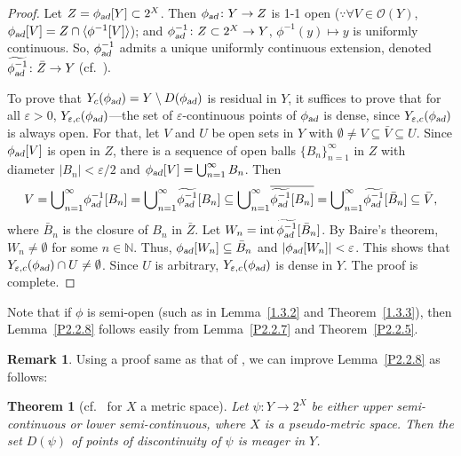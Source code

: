 \documentclass[12pt,final,3p,times]{elsarticle}
\newtheorem*{xthm}{Theorem}
\theoremstyle{definition}
\newtheorem{srem}[sthm]{Remark}
\numberwithin{equation}{section}
\begin{document}
\begin{proof}
Let $Z=\phi_{\textsl{ad}}[Y]\subset2^X$. Then $\phi_\textsl{ad}\colon Y\rightarrow Z$ is 1-1 open ($\because\forall V\in\mathscr{O}(Y)$, $\phi_{\textsl{ad}}[V]=Z\cap\langle \phi^{-1}[V]\rangle$); and $\phi_{\textsl{ad}}^{-1}\colon Z\subset2^X\rightarrow Y$, $\phi^{-1}(y)\mapsto y$ is uniformly continuous. So, $\phi_{\textsl{ad}}^{-1}$ admits a unique uniformly continuous extension, denoted $\widetilde{\phi_\textsl{ad}^{-1}}\colon \bar{Z}\rightarrow Y$\,(cf.~\cite[Thm.~6.26]{K55}).

To prove that $Y_c(\phi_\textsl{ad})=Y\setminus D(\phi_\textsl{ad})$ is residual in $Y$, it suffices to prove that for all $\varepsilon>0$, $Y_{\varepsilon,c}(\phi_\textsl{ad})$---the set of $\varepsilon$-continuous points of $\phi_\textsl{ad}$ is dense, since $Y_{\varepsilon,c}(\phi_\textsl{ad})$ is always open. For that, let $V$ and $U$ be open sets in $Y$ with $\emptyset\not=V\subseteq\bar{V}\subseteq U$. Since $\phi_\textsl{ad}[V]$ is open in $Z$, there is a sequence of open balls $\{B_n\}_{n=1}^\infty$ in $Z$ with diameter
$|B_n|<\varepsilon/2$ and $\phi_\textsl{ad}[V]=\bigcup_{n=1}^\infty B_n$. Then
$$
V={\bigcup}_{n=1}^\infty \phi_\textsl{ad}^{-1}[B_n]={\bigcup}_{n=1}^\infty \widetilde{\phi_\textsl{ad}^{-1}}[B_n]\subseteq {\bigcup}_{n=1}^\infty \overline{\widetilde{\phi_\textsl{ad}^{-1}}[B_n]}={\bigcup}_{n=1}^\infty \widetilde{\phi_\textsl{ad}^{-1}}[\bar{B}_n]\subseteq\bar{V},
$$
where $\bar{B}_n$ is the closure of $B_n$ in $\bar{Z}$. Let $W_n=\mathrm{int}\,\widetilde{\phi_\textsl{ad}^{-1}}[\bar{B}_n]$. By Baire's theorem, $W_n\not=\emptyset$ for some $n\in\mathbb{N}$. Thus, $\phi_\textsl{ad}[W_n]\subseteq\bar{B}_n$ and $|\phi_\textsl{ad}[W_n]|<\varepsilon$. This shows that $Y_{\varepsilon,c}(\phi_\textsl{ad})\cap U\not=\emptyset$. Since $U$ is arbitrary, $Y_{\varepsilon,c}(\phi_\textsl{ad})$ is dense in $Y$. The proof is complete.
\end{proof}

Note that if $\phi$ is semi-open (such as in Lemma~\ref{1.3.2} and Theorem~\ref{1.3.3}), then Lemma~\ref{P2.2.8} follows easily from Lemma~\ref{P2.2.7} and Theorem~\ref{P2.2.5}.

\begin{srem}
Using a proof same as that of \cite[Thms.~1 $\&$~2]{Fo51}, we can improve Lemma~\ref{P2.2.8} as follows:

\begin{xthm}[{cf.~\cite[Thms.~1 $\&$~2]{Fo51} for $X$ a metric space}]
Let $\psi\colon Y\rightarrow 2^X$ be either upper semi-continuous or lower semi-continuous, where $X$ is a pseudo-metric space. Then the set
$D(\psi)$ of points of discontinuity of $\psi$ is meager in $Y$.
\end{xthm}
\end{srem}
\end{document}
